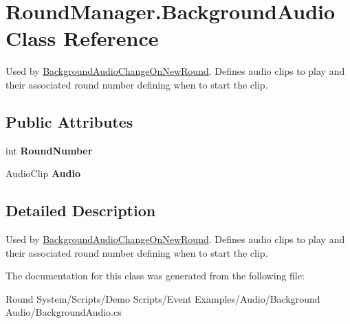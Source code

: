 \hypertarget{class_round_manager_1_1_background_audio}{}\section{Round\+Manager.\+Background\+Audio Class Reference}
\label{class_round_manager_1_1_background_audio}


Used by \hyperlink{class_round_manager_1_1_background_audio_change_on_new_round}{Background\+Audio\+Change\+On\+New\+Round}. Defines audio clips to play and their associated round number defining when to start the clip.  


\subsection*{Public Attributes}
\begin{DoxyCompactItemize}
\item 
\hypertarget{class_round_manager_1_1_background_audio_a835e048dc5976e571c92d458a4efef53}{}int {\bfseries Round\+Number}\label{class_round_manager_1_1_background_audio_a835e048dc5976e571c92d458a4efef53}

\item 
\hypertarget{class_round_manager_1_1_background_audio_ae8334ad2034498e87d596e66242d0bff}{}Audio\+Clip {\bfseries Audio}\label{class_round_manager_1_1_background_audio_ae8334ad2034498e87d596e66242d0bff}

\end{DoxyCompactItemize}


\subsection{Detailed Description}
Used by \hyperlink{class_round_manager_1_1_background_audio_change_on_new_round}{Background\+Audio\+Change\+On\+New\+Round}. Defines audio clips to play and their associated round number defining when to start the clip. 



The documentation for this class was generated from the following file\+:\begin{DoxyCompactItemize}
\item 
Round System/\+Scripts/\+Demo Scripts/\+Event Examples/\+Audio/\+Background Audio/Background\+Audio.\+cs\end{DoxyCompactItemize}
